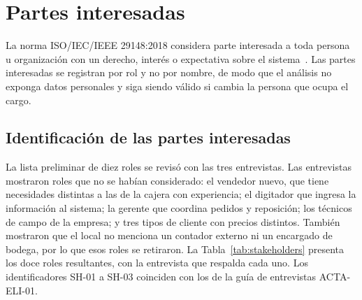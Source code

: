 \section{Partes interesadas}\label{sec:stakeholders}

La norma ISO/IEC/IEEE 29148:2018 considera parte interesada a toda persona u organización con un derecho, interés o expectativa sobre el sistema~\cite{iso29148}. Las partes interesadas se registran por rol y no por nombre, de modo que el análisis no exponga datos personales y siga siendo válido si cambia la persona que ocupa el cargo.

\subsection{Identificación de las partes interesadas}

La lista preliminar de diez roles se revisó con las tres entrevistas. Las entrevistas mostraron roles que no se habían considerado: el vendedor nuevo, que tiene necesidades distintas a las de la cajera con experiencia; el digitador que ingresa la información al sistema; la gerente que coordina pedidos y reposición; los técnicos de campo de la empresa; y tres tipos de cliente con precios distintos. También mostraron que el local no menciona un contador externo ni un encargado de bodega, por lo que esos roles se retiraron. La Tabla~\ref{tab:stakeholders} presenta los doce roles resultantes, con la entrevista que respalda cada uno. Los identificadores SH-01 a SH-03 coinciden con los de la guía de entrevistas ACTA-ELI-01.

